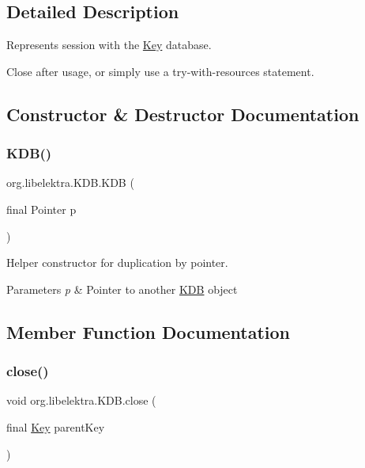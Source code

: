 \subsection{Detailed Description}
Represents session with the \mbox{\hyperlink{classorg_1_1libelektra_1_1Key}{Key}} database. 

Close after usage, or simply use a try-\/with-\/resources statement. 

\subsection{Constructor \& Destructor Documentation}
\mbox{\label{classorg_1_1libelektra_1_1KDB_a256255ad383403a2efe699c4ccc4fe12}} 
\subsubsection{\texorpdfstring{KDB()}{KDB()}}
{\footnotesize\ttfamily org.\+libelektra.\+K\+D\+B.\+K\+DB (\begin{DoxyParamCaption}\item[{final Pointer}]{p }\end{DoxyParamCaption})\hspace{0.3cm}{\ttfamily [inline]}}



Helper constructor for duplication by pointer. 


\begin{DoxyParams}{Parameters}
{\em p} & Pointer to another \mbox{\hyperlink{classorg_1_1libelektra_1_1KDB}{K\+DB}} object \\
\hline
\end{DoxyParams}


\subsection{Member Function Documentation}
\mbox{\label{classorg_1_1libelektra_1_1KDB_af6b472eadf78ba4ed216303b52ddb29e}} 
\subsubsection{\texorpdfstring{close()}{close()}}
{\footnotesize\ttfamily void org.\+libelektra.\+K\+D\+B.\+close (\begin{DoxyParamCaption}\item[{final \mbox{\hyperlink{classorg_1_1libelektra_1_1Key}{Key}}}]{parent\+Key }\end{DoxyParamCaption})\hspace{0.3cm}{\ttfamily [inline]}}




